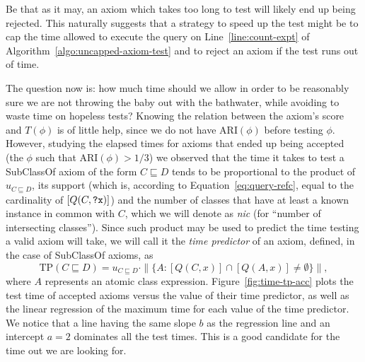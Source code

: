 \documentclass{sig-alternate}
\newcommand{\VAR}[1]{\leavevmode\hbox{\it #1\/}}
\begin{document}
Be that as it may, an axiom which takes too long to test will likely end up
being rejected. This naturally suggests that a strategy to speed up the test might
be to cap the time allowed to execute the query on Line~\ref{line:count-expt}
of Algorithm~\ref{algo:uncapped-axiom-test} and to reject an axiom if the test
runs out of time.

The question now is: how much time should we allow in order to be reasonably sure
we are not throwing the baby out with the bathwater, while avoiding to waste
time on hopeless tests?
Knowing the relation between the axiom's score and $T(\phi)$ is of little help,
since we do not have $\mathrm{ARI}(\phi)$ before testing $\phi$. However,
studying the elapsed times for axioms that ended up being accepted
(the $\phi$ such that $\mathrm{ARI}(\phi) > 1/3$)
we observed that the time it takes to test a \textsf{SubClassOf} axiom of the form
$C \sqsubseteq D$ tends to be proportional to the product of $u_{C \sqsubseteq D}$,
its support (which is, according to Equation~\ref{eq:query-refc},
equal to the cardinality of $[Q(C, \mbox{\tt ?x})]$)
and the number of classes that have at least a known instance in common with $C$,
which we will denote as \VAR{nic} (for ``number of intersecting classes'').
Since such product may be used to predict the time testing a valid axiom will take,
we will call it the \emph{time predictor} of an axiom, defined, in the case
of \textsf{SubClassOf} axioms, as
\begin{equation}\label{eq:time-predictor}
  \mathrm{TP}(C \sqsubseteq D) = u_{C \sqsubseteq D} \cdot
  \|\{A: [Q(C, x)] \cap [Q(A, x)] \neq \emptyset \}\|,
\end{equation}
where $A$ represents an atomic class expression.
Figure~\ref{fig:time-tp-acc} plots the test time of accepted axioms versus the
value of their time predictor, as well as the linear regression of the maximum time
for each value of the time predictor. We notice that a line having the same
slope $b$ as the regression line and an intercept $a = 2$ dominates all the
test times. This is a good candidate for the time out we are looking for.
\end{document}
